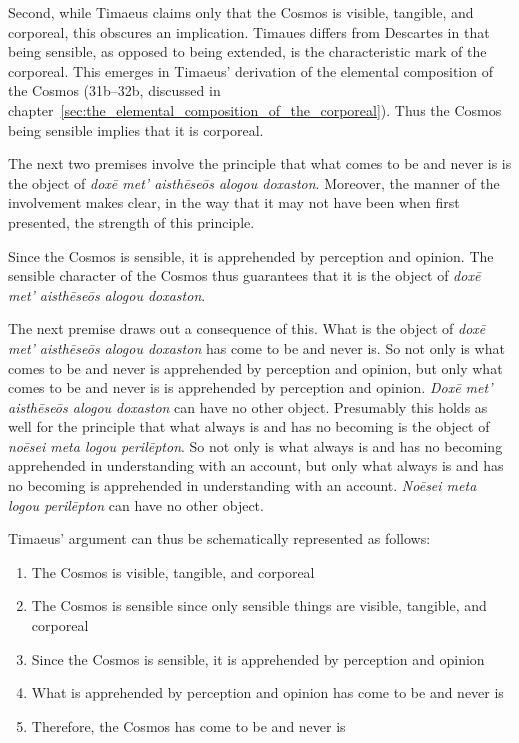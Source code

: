 Second, while Timaeus claims only that the Cosmos is visible, tangible, and corporeal, this obscures an implication. Timaues differs from Descartes in that being sensible, as opposed to being extended, is the characteristic mark of the corporeal. This emerges in Timaeus' derivation of the elemental composition of the Cosmos (31b--32b, discussed in chapter~\ref{sec:the_elemental_composition_of_the_corporeal}). Thus the  Cosmos being sensible implies that it is corporeal.

The next two premises involve the principle that what comes to be and never is is the object of \emph{doxē met’ aisthēseōs alogou doxaston}. Moreover, the manner of the involvement makes clear, in the way that it may not have been when first presented, the strength of this principle.

Since the Cosmos is sensible, it is apprehended by perception and opinion. The sensible character of the Cosmos thus guarantees that it is the object of \emph{doxē met’ aisthēseōs alogou doxaston}. 

The next premise draws out a consequence of this. What is the object of \emph{doxē met’ aisthēseōs alogou doxaston} has come to be and never is. So not only is what comes to be and never is apprehended by perception and opinion, but only what comes to be and never is is apprehended by perception and opinion. \emph{Doxē met’ aisthēseōs alogou doxaston} can have no other object. Presumably this holds as well for the principle that what always is and has no becoming is the object of \emph{noēsei meta logou perilēpton}. So not only is what always is and has no becoming apprehended in understanding with an account, but only what always is and has no becoming is apprehended in understanding with an account. \emph{Noēsei meta logou perilēpton} can have no other object.

Timaeus' argument can thus be schematically represented as follows:
\begin{enumerate}[(1)]
	\item The Cosmos is visible, tangible, and corporeal
	\item The Cosmos is sensible since only sensible things are visible, tangible, and corporeal
	\item Since the Cosmos is sensible, it is apprehended by perception and opinion
	\item What is apprehended by perception and opinion has come to be and never is
	\item Therefore, the Cosmos has come to be and never is
\end{enumerate}

